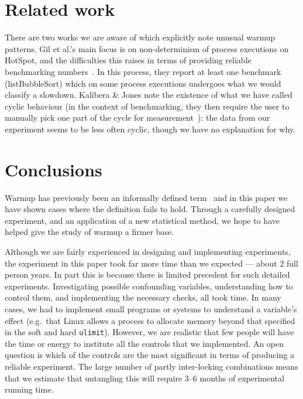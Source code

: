 \documentclass[preprint,numbers,10pt]{sigplanconf}
\newcommand{\kalibera}{Kalibera \& Jones\xspace}
\begin{document}
\section{Related work}

There are two works we are aware of which explicitly note unusual warmup
patterns. Gil et al.'s main focus is on non-determinism of process executions on
HotSpot, and the difficulties this raises in terms of providing reliable
benchmarking numbers~\cite{gil11microbenchmark}. In this process, they report at
least one benchmark (listBubbleSort) which on some process executions undergoes what we
would classify a slowdown. \kalibera note the
existence of what we have called cyclic behaviour (in the context of benchmarking,
they then require the user to
manually pick one part of the cycle for measurement~\cite{kalibera13rigorous}):
the data from our experiment seems to be less often cyclic, though we have no
explanation for why.


\section{Conclusions}
\label{sec:conclusion}

Warmup has previously been an informally defined term~\cite{seaton15phd} and in this
paper we have shown cases where the definition fails to hold. Through a carefully
designed experiment, and an application of a new statistical method, we hope
to have helped give the study of warmup a firmer base.

Although we are fairly experienced in designing and implementing
experiments, the experiment in this paper took far more time than we expected
--- about 2 full person years. In part this is because there is limited precedent for such detailed
experiments. Investigating possible confounding variables, understanding how to
control them, and implementing the necessary checks, all took time. In many
cases, we had to implement small programs or systems to understand a variable's
effect (e.g.~that Linux allows a process to allocate memory beyond that
specified in the soft and hard \texttt{ulimit}). However, we are realistic that
few people will have the time or energy to institute all the controls that we
implemented. An open question is which of the controls are the most significant
in terms of producing a reliable experiment. The large number of partly
inter-locking combinations means that we estimate that untangling this will
require 3--6 months of experimental running time.
\end{document}
